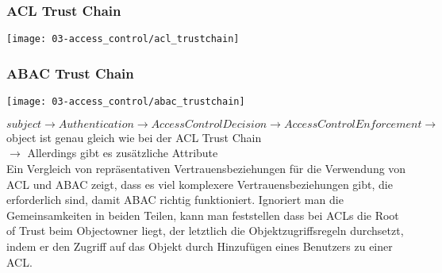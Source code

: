 \newpage

\subsubsection{ACL Trust Chain}
\begin{center}
    \texttt{[image: 03-access\_control/acl\_trustchain]}
    \vspace{-8pt}
\end{center}

\subsubsection{ABAC Trust Chain}
\begin{center}
    \texttt{[image: 03-access\_control/abac\_trustchain]}
    \vspace{-8pt}
\end{center}

$subject \rightarrow Authentication \rightarrow Access Control Decision \rightarrow Access Control Enforcement \rightarrow$ object ist genau gleich wie bei der ACL Trust Chain\\
$\rightarrow$ Allerdings gibt es zusätzliche Attribute\\

Ein Vergleich von repräsentativen Vertrauensbeziehungen für die Verwendung von ACL und ABAC zeigt, dass es viel komplexere Vertrauensbeziehungen gibt, die erforderlich sind, damit ABAC richtig funktioniert. Ignoriert man die Gemeinsamkeiten in beiden Teilen, kann man feststellen dass bei ACLs die Root of Trust beim Objectowner liegt, der letztlich die Objektzugriffsregeln durchsetzt, indem er den Zugriff auf das Objekt durch Hinzufügen eines Benutzers zu einer ACL. 

